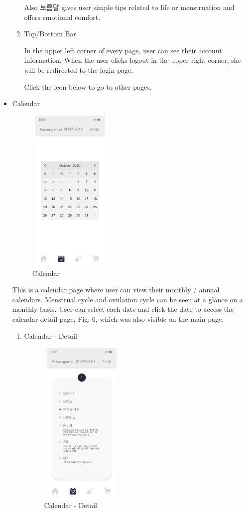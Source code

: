 \documentclass[conference]{IEEEtran}
\begin{document}
\begin{itemize}
\begin{enumerate}
        Also 보름달 gives user simple tips related to life or menstruation and offers emotional comfort.
        \item Top/Bottom Bar
        
        In the upper left corner of every page, user can see their account information. When the user clicks logout in the upper right corner, she will be redirected to the login page. 
        
        Click the icon below to go to other pages.
    \end{enumerate}
    \item Calendar
    
    \begin{figure}[htbp]
    \includegraphics[width=4cm, height=8cm, center]{Calendar.png}
    \caption{Calendar}
    \label{fig : Calendar}
    \end{figure}
    
    This is a calendar page where user can view their monthly / annual calendars. Menstrual cycle and ovulation cycle can be seen at a glance on a monthly basis. User can select each date and click the date to access the calendar-detail page, Fig. 6, which was also visible on the main page.
    \begin{enumerate}
    \setlength{\parindent}{2ex}
        \item Calendar - Detail
        
        \begin{figure}[ht]
        \includegraphics[width=4cm, height=8cm, center]{detail.png}
        \caption{Calendar - Detail}
        \label{fig : Detail}
        \end{figure}
        

\end{enumerate}
\end{itemize}
\end{document}
